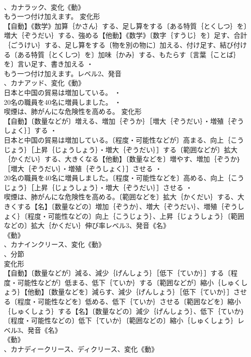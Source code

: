 \documentclass[8pt]{extreport}
\begin{document}
\begin{CJK}{UTF8}{min}
\\	、カナラック、変化《動》
\\	もう一つ付け加えます。	変化形 
\\	【自動】《数学》加算｛かさん｝する、足し算をする〔ある特質｛とくしつ｝を〕増大｛ぞうだい｝する、強める【他動】《数学》〔数字｛すうじ｝を〕足す、合計｛ごうけい｝する、足し算をする〔物を別の物に〕加える、付け足す、結び付ける〔ある特質｛とくしつ｝を〕加味｛かみ｝する、もたらす〔言葉｛ことば｝を〕言い足す、書き加える ・
\\	もう一つ付け加えます。レベル2、発音
\\	、カナアッド、変化《動》
\\	日本と中国の貿易は増加している。 ・
\\	20名の職員を40名に増員しました。 ・
\\	喫煙は、肺がんにな危険性を高める。	変化形 
\\	【自動】〔数量などが〕増える、増加｛ぞうか｝［増大｛ぞうだい｝・増殖｛ぞうしょく｝］する ・
\\	日本と中国の貿易は増加している。〔程度・可能性などが〕高まる、向上｛こうじょう｝［上昇｛じょうしょう｝・増大｛ぞうだい｝］する〔範囲などが〕拡大｛かくだい｝する、大きくなる【他動】〔数量などを〕増やす、増加｛ぞうか｝［増大｛ぞうだい｝・増殖｛ぞうしょく｝］させる ・
\\	20名の職員を40名に増員しました。〔程度・可能性などを〕高める、向上｛こうじょう｝［上昇｛じょうしょう｝・増大｛ぞうだい｝］させる ・
\\	喫煙は、肺がんにな危険性を高める。〔範囲などを〕拡大｛かくだい｝する、大きくする【名】〔数量などの〕増加｛ぞうか｝、増大｛ぞうだい｝、増殖｛ぞうしょく｝〔程度・可能性などの〕向上｛こうじょう｝、上昇｛じょうしょう｝〔範囲などの〕拡大｛かくだい｝伸び率レベル3、発音《名》
\\	《動》
\\	、カナインクリース、変化《動》
\\	、分節
\\	変化形 
\\	【自動】〔数量などが〕減る、減少｛げんしょう｝［低下｛ていか｝］する〔程度・可能性などが〕低まる、低下｛ていか｝する〔範囲などが〕縮小｛しゅくしょう｝【他動】〔数量などを〕減らす、減少｛げんしょう｝［低下｛ていか｝］させる〔程度・可能性などを〕低める、低下｛ていか｝させる〔範囲などを〕縮小｛しゅくしょう｝する【名】〔数量などの〕減少｛げんしょう｝、低下｛ていか｝〔程度・可能性などの〕低下｛ていか｝〔範囲などの〕縮小｛しゅくしょう｝レベル3、発音《名》
\\	《動》
\\	、カナディークリース、ディクリース、変化《動》

\end{CJK}
\end{document}
